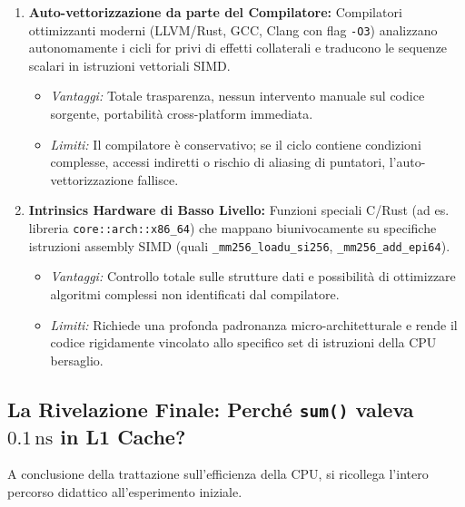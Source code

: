 \begin{enumerate}
    \item \textbf{Auto-vettorizzazione da parte del Compilatore:}
    Compilatori ottimizzanti moderni (LLVM/Rust, GCC, Clang con flag \texttt{-O3}) analizzano autonomamente i cicli for privi di effetti collaterali e traducono le sequenze scalari in istruzioni vettoriali SIMD.
    \begin{itemize}
        \item \textit{Vantaggi:} Totale trasparenza, nessun intervento manuale sul codice sorgente, portabilit\`a cross-platform immediata.
        \item \textit{Limiti:} Il compilatore \`e conservativo; se il ciclo contiene condizioni complesse, accessi indiretti o rischio di aliasing di puntatori, l'auto-vettorizzazione fallisce.
    \end{itemize}
    \item \textbf{Intrinsics Hardware di Basso Livello:}
    Funzioni speciali C/Rust (ad es. libreria \texttt{core::arch::x86\_64}) che mappano biunivocamente su specifiche istruzioni assembly SIMD (quali \texttt{\_mm256\_loadu\_si256}, \texttt{\_mm256\_add\_epi64}).
    \begin{itemize}
        \item \textit{Vantaggi:} Controllo totale sulle strutture dati e possibilit\`a di ottimizzare algoritmi complessi non identificati dal compilatore.
        \item \textit{Limiti:} Richiede una profonda padronanza micro-architetturale e rende il codice rigidamente vincolato allo specifico set di istruzioni della CPU bersaglio.
    \end{itemize}
\end{enumerate}

\FloatBarrier
\subsection{La Rivelazione Finale: Perch\'e \texttt{sum()} valeva $0.1\,\text{ns}$ in L1 Cache?}
\label{subsec:soluzione-enigma-l1}

A conclusione della trattazione sull'efficienza della CPU, si ricollega l'intero percorso didattico all'esperimento iniziale.

